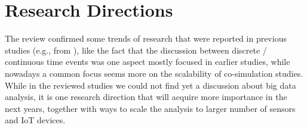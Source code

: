 \documentclass[1p]{elsarticle} %
\begin{document}







\section{Research Directions}
\label{sec:research_dir}

The review confirmed some trends of research that were reported in previous studies (e.g., from \citet{ref:steinbrink2018future}), like the fact that the discussion between discrete / continuous time events was one aspect mostly focused in earlier studies, while nowadays a common focus seems more on the scalability of co-simulation studies. While in the reviewed studies we could not find yet a discussion about big data analysis, it is one research direction that will acquire more importance in the next years, together with ways to scale the analysis to larger number of sensors and IoT devices.
\end{document}

